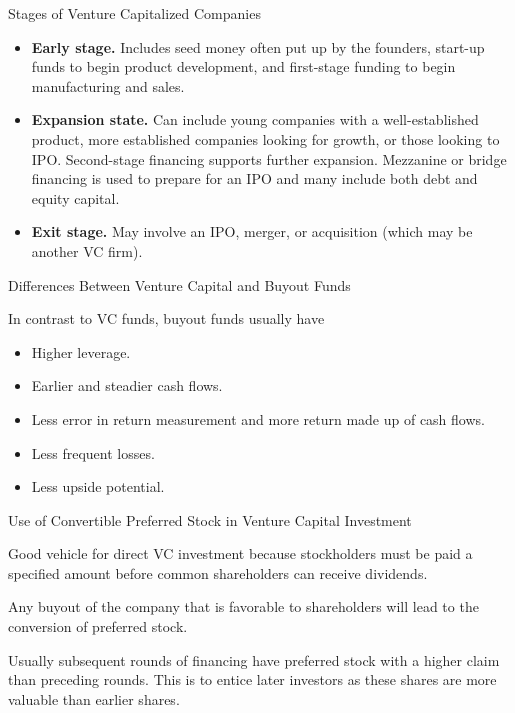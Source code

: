 \documentclass[../custom,grid]{flashcards}
\begin{document}
\begin{flashcard}{Stages of Venture Capitalized Companies}
    \begin{itemize}
        \item \textbf{Early stage.} Includes seed money often put up by the founders, start-up funds to begin product development, and first-stage funding to begin manufacturing and sales.
        \item \textbf{Expansion state.} Can include young companies with a well-established product, more established companies looking for growth, or those looking to IPO. Second-stage financing supports further expansion. Mezzanine or bridge financing is used to prepare for an IPO and many include both debt and equity capital.
        \item \textbf{Exit stage.} May involve an IPO, merger, or acquisition (which may be another VC firm).
    \end{itemize}
\end{flashcard}

\begin{flashcard}{Differences Between Venture Capital and Buyout Funds}
    \begin{flushleft}
        In contrast to VC funds, buyout funds usually have
        \begin{itemize}
            \item Higher leverage.
            \item Earlier and steadier cash flows.
            \item Less error in return measurement and more return made up of cash flows.
            \item Less frequent losses.
            \item Less upside potential.
        \end{itemize}
    \end{flushleft}
\end{flashcard}

\begin{flashcard}{Use of Convertible Preferred Stock in Venture Capital Investment}
    \begin{flushleft}
        Good vehicle for direct VC investment because stockholders must be paid a specified amount before common shareholders can receive dividends.\newline

        Any buyout of the company that is favorable to shareholders will lead to the conversion of preferred stock.\newline

        Usually subsequent rounds of financing have preferred stock with a higher claim than preceding rounds. This is to entice later investors as these shares are more valuable than earlier shares. 
    \end{flushleft}
\end{flashcard}
\end{document}

